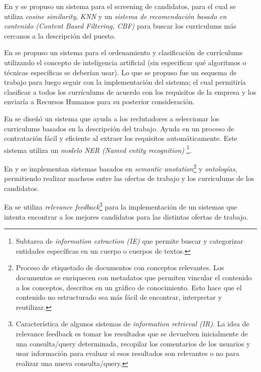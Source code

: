 \documentclass[12pt,a4paper]{article}
\begin{document}
\begin{sloppypar}
En \cite{trabajos_relacionados_7} y \cite{trabajos_relacionados_8} se propuso un sistema para el screening de candidatos, para el cual se utiliza \textit{cosine similarity}, \textit{KNN} y un \textit{sistema de recomendación basado en contenido (Content Based Filtering, CBF)} para buscar los curriculums más cercanos a la descripción del puesto.

En \cite{trabajos_relacionados_9} se propuso un sistema para el ordenamiento y clasificación de currículums utilizando el concepto de inteligencia artificial (sin especificar qué algoritmos o técnicas específicas se deberían usar). Lo que se propuso fue un esquema de trabajo para luego seguir con la implementación del sistema; el cual permitiría clasificar a todos los currículums de acuerdo con los requisitos de la empresa y los enviaría a Recursos Humanos para su posterior consideración.

En \cite{trabajos_relacionados_10} se diseñó un sistema que ayuda a los reclutadores a seleccionar los curriculums basados en la descripción del trabajo. Ayuda en un proceso de contratación fácil y eficiente al extraer los requisitos automáticamente. Este sistema utiliza un \textit{modelo NER (Named entity recognition)} \footnote{Subtarea de \textit{information extraction (IE)} que permite buscar y categorizar entidades específicas en un cuerpo o cuerpos de textos.}.

En \cite{trabajos_relacionados_11} y \cite{trabajos_relacionados_12} se implementan sistemas basados en \textit{semantic anotation}\footnote{Proceso de etiquetado de documentos con conceptos relevantes. Los documentos se enriquecen con metadatos que permiten vincular el contenido a los conceptos, descritos en un gráfico de conocimiento. Esto hace que el contenido no estructurado sea más fácil de encontrar, interpretar y reutilizar.} y \textit{ontologías}, permitiendo realizar macheos entre las ofertas de trabajo y los curriculums de los candidatos.

En \cite{trabajos_relacionados_13} se utiliza \textit{relevance feedback}\footnote{Característica de algunos sistemas de \textit{information retrieval (IR)}. La idea de relevance feedback es tomar los resultados que se devuelven inicialmente de una consulta/query determinada, recopilar los comentarios de los usuarios y usar información para evaluar si esos resultados son relevantes o no para realizar una nueva consulta/query.} para la implementación de un sistemas que intenta encontrar a los mejores candidatos para las distintas ofertas de trabajo.


\end{sloppypar}
\end{document}
